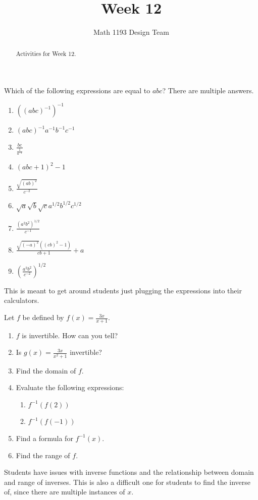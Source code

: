 \documentclass[noauthor,noinstructornotes]{ximera}
\title{Week 12}
\author{Math 1193 Design Team}
\begin{document}
\begin{abstract}
    Activities for Week 12.
\end{abstract}
\maketitle
 
\begin{problem}
Which of the following expressions are equal to \(abc\)? There are multiple
answers.
\begin{enumerate}
    \item \(\left((abc)^{-1}\right)^{-1}\)
    \item \((abc)^{-1}a^{-1}b^{-1}c^{-1}\)
    \item \(\frac{bc}{\frac{1}{a^{-1}}}\)
    \item \((abc + 1)^2 - 1\)
    \item \(\frac{\sqrt{(ab)^2}}{c^{-2}}\)
    \item \(\sqrt{a}\sqrt{b}\sqrt{c}a^{1/2}b^{1/2}c^{1/2}\)
    \item \(\frac{(a^{2}b^{2})^{1/2}}{c^{-1}}\)
    \item \(\frac{\sqrt{(-a)^2}((cb)^2 - 1)}{cb + 1} + a\)
    \item \(\left(\frac{a^2b^2}{c^{-2}}\right)^{1/2}\)
\end{enumerate}
\begin{instructorNotes}
    This is meant to get around students just plugging the expressions into their calculators.
\end{instructorNotes}
\end{problem}
 
\begin{problem}
Let \(f\) be defined by \(f(x) = \frac{3x}{x + 1}\).
 
\begin{enumerate}
\item \(f\) is invertible. How can you tell?
\item Is \(g(x) = \frac{3x}{x^2 + 1}\) invertible?
\item Find the domain of \(f\).
\item Evaluate the following expressions:
\begin{enumerate}
    \item \(f^{-1}(f(2))\)
    \item \(f^{-1}(f(-1))\)
\end{enumerate}
\item Find a formula for \(f^{-1}(x)\).
\item Find the range of \(f\).
\end{enumerate}
 
\begin{instructorNotes}
    Students have issues with inverse functions and the relationship between domain and range of inverses.
    This is also a difficult one for students to find the inverse of, since there are multiple instances of \(x\).
\end{instructorNotes}
\end{problem}
 
\end{document}
